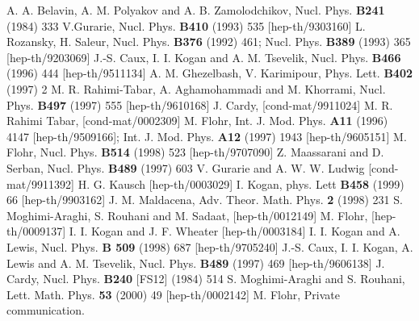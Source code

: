 \documentclass[a4paper,11pt]{article}
\begin{document}
\begin{thebibliography}{99}
A. A. Belavin, A. M. Polyakov and
A. B. Zamolodchikov, Nucl. Phys. {\bf B241} (1984) 333
 V.Gurarie, Nucl. Phys. {\bf B410} (1993) 535
[hep-th/9303160]
 L. Rozansky, H. Saleur, Nucl. Phys. {\bf B376}
(1992) 461; Nucl. Phys. {\bf B389} (1993) 365 [hep-th/9203069]
 J.-S. Caux, I. I. Kogan and A. M. Tsevelik, Nucl. Phys. {\bf B466}
(1996) 444 [hep-th/9511134]
 A. M. Ghezelbash, V. Karimipour, Phys. Lett. {\bf B402} (1997) 2
 M. R. Rahimi-Tabar, A. Aghamohammadi and
M. Khorrami, Nucl. Phys. {\bf B497} (1997) 555 [hep-th/9610168]
 J. Cardy, [cond-mat/9911024]
 M. R. Rahimi Tabar, [cond-mat/0002309]
 M. Flohr, Int. J. Mod. Phys. {\bf A11} (1996) 4147
[hep-th/9509166]; Int. J. Mod. Phys. {\bf A12} (1997) 1943
[hep-th/9605151]
 M. Flohr, Nucl. Phys. {\bf B514} (1998) 523
[hep-th/9707090]
 Z. Maassarani and D. Serban, Nucl. Phys. {\bf B489} (1997) 603
 V. Gurarie and A. W. W. Ludwig [cond-mat/9911392]
 H. G. Kausch [hep-th/0003029]
 I. Kogan, phys. Lett {\bf B458} (1999) 66
[hep-th/9903162]
 J. M. Maldacena, Adv. Theor. Math. Phys. {\bf 2}
(1998) 231
 S. Moghimi-Araghi, S. Rouhani and M. Sadaat,
[hep-th/0012149]
 M. Flohr, [hep-th/0009137]
 I. I. Kogan and J. F. Wheater [hep-th/0003184]
 I. I. Kogan and A. Lewis, Nucl. Phys. {\bf B 509}
(1998) 687 [hep-th/9705240]
 J.-S. Caux, I. I. Kogan, A. Lewis and A. M.
Tsevelik, Nucl. Phys. {\bf B489} (1997) 469 [hep-th/9606138]
 J. Cardy, Nucl. Phys. {\bf B240} [FS12] (1984) 514
 S. Moghimi-Araghi and S. Rouhani, Lett. Math. Phys. {\bf 53} (2000) 49 [hep-th/0002142]
 M. Flohr, Private communication.
\end{thebibliography}
\end{document}
